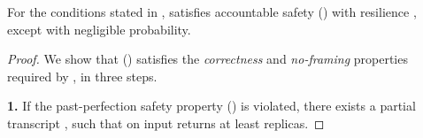 

\begin{lemma}\label{lem:pod-accountable-safety}
	For the conditions stated in ,  satisfies accountable safety () with resilience \beta, except with negligible probability.
\end{lemma}
\begin{proof}
	We show that \identify{} () satisfies the \emph{correctness} and \emph{no-framing} properties required by , in three steps.

	\textbf{1.}
	If the past-perfection safety property () is violated, there exists a partial transcript \tran, such that \identify{} on input \tran returns at least \beta replicas.


\end{proof}
